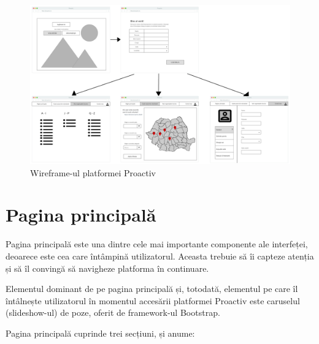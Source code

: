 \documentclass[12pt,a4paper]{report}
\begin{document}
\begin{figure}[H]
\centering
  \includegraphics[width=1\linewidth]{./imagini/GUI.jpg}
  \caption{Wireframe-ul platformei Proactiv}
\end{figure}


\section{Pagina principală}
\par
Pagina principală este una dintre cele mai importante componente ale interfeței, deoarece este cea care întâmpină utilizatorul. Aceasta trebuie să îi capteze atenția și să îl convingă să navigheze platforma în continuare.
\\\par
Elementul dominant de pe pagina principală și, totodată, elementul pe care îl întâlnește utilizatorul în momentul accesării platformei Proactiv este caruselul (slideshow-ul) de poze, oferit de framework-ul Bootstrap. 
\\\par
Pagina principală cuprinde trei secțiuni, și anume:
\par
\end{document}
